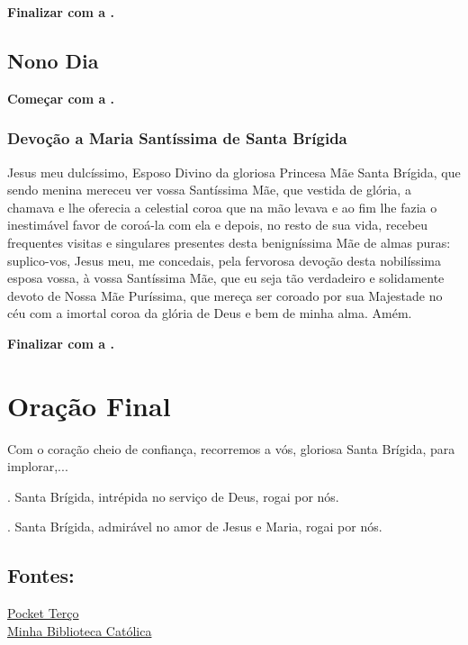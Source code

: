 \documentclass[a4paper,12pt]{extarticle} \usepackage[utf8]{inputenc}
\makeatletter
\newcommand{\vers@resp@sym}{%
  \raisebox{0.2ex}{\rotatebox[origin=c]{-20}{$\m@th\rceil$}}%
}
\newcommand{\vers@resp}[2]{%
  {\ooalign{%
     \hidewidth\kern#1\vers@resp@sym\hidewidth\cr
     #2\cr
  }}%
}
\DeclareRobustCommand{\versicle}{\vers@resp{-0.1em}{V}}
\DeclareRobustCommand{\response}{\vers@resp{0pt}{R}}
\makeatother
\begin{document}
\noindent
\textbf{Finalizar com a .}


\subsection{Nono Dia}

\noindent
\textbf{Começar com a .}

\subsubsection*{Devoção a Maria Santíssima de Santa Brígida}

Jesus meu dulcíssimo, Esposo Divino da gloriosa Princesa Mãe Santa Brígida, que sendo menina mereceu ver vossa Santíssima Mãe, que vestida de glória, a chamava e lhe oferecia a celestial coroa que na mão levava e ao fim lhe fazia o inestimável favor de coroá-la com ela e depois, no resto de sua vida, recebeu frequentes visitas e singulares presentes desta benigníssima Mãe de almas puras: suplico-vos, Jesus meu, me concedais, pela fervorosa devoção desta nobilíssima esposa vossa, à vossa Santíssima Mãe, que eu seja tão verdadeiro e solidamente devoto de Nossa Mãe Puríssima, que mereça ser coroado por sua Majestade no céu com a imortal coroa da glória de Deus e bem de minha alma. Amém.

\noindent
\textbf{Finalizar com a .}

\newpage
\section{Oração Final} \label{oracao-final}

Com o coração cheio de confiança, recorremos a vós, gloriosa Santa Brígida, para implorar,...

\versicle. \quad Santa Brígida, intrépida no serviço de Deus, rogai por nós.

\response. \quad Santa Brígida, admirável no amor de Jesus e Maria, rogai por nós.

\vfill

\begin{center}
\subsection*{Fontes:}
\href{https://pocketterco.com.br/terco/novena-a-santa-brigida-inicia-em-14-de-julho}{Pocket Terço}\\ 
\href{https://bibliotecacatolica.com.br/blog/formacao/santa-brigida/}{Minha Biblioteca Católica}
\end{center}
\end{document}
